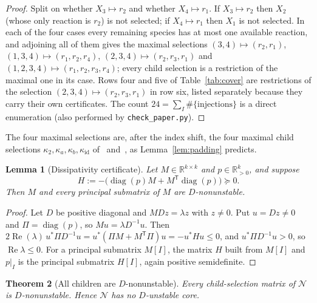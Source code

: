\documentclass[11pt,a4paper]{article}
\theoremstyle{plain}
\newtheorem{theorem}{Theorem}[section]
\newtheorem{lemma}[theorem]{Lemma}
\theoremstyle{definition}
\theoremstyle{remark}
\newcommand{\R}{\mathbb{R}}
\newcommand{\diag}{\operatorname{diag}}
\newcommand{\Real}{\operatorname{Re}}
\newcommand{\Osc}{\mathcal{N}}
\begin{document}
\begin{proof}
Split on whether $X_3\mapsto r_2$ and whether $X_4\mapsto r_1$. If $X_3\mapsto r_2$ then $X_2$ (whose only reaction is $r_2$) is not selected; if $X_4\mapsto r_1$ then $X_1$ is not selected. In each of the four cases every remaining species has at most one available reaction, and adjoining all of them gives the maximal selections $(3,4)\mapsto(r_2,r_1)$, $(1,3,4)\mapsto(r_1,r_2,r_4)$, $(2,3,4)\mapsto(r_2,r_3,r_1)$ and $(1,2,3,4)\mapsto(r_1,r_2,r_3,r_4)$; every child selection is a restriction of the maximal one in its case. Rows four and five of Table~\ref{tab:cover} are restrictions of the selection $(2,3,4)\mapsto(r_2,r_3,r_1)$ in row six, listed separately because they carry their own certificates. The count $24=\sum_{I}\#\{\text{injections}\}$ is a direct enumeration (also performed by \texttt{check\_paper.py}).
\end{proof}

The four maximal selections are, after the index shift, the four maximal child selections $\kappa_2,\kappa_a,\kappa_b,\kappa_{\mathrm{id}}$ of~\cite[Lemma~4.1]{ParameterRich2026} and~\cite[Lemma~4.2]{KineticOrder2026}, as Lemma~\ref{lem:padding} predicts.

\begin{lemma}[Dissipativity certificate]\label{lem:dissipative}
Let $M\in\R^{k\times k}$ and $p\in\R_{>0}^k$, and suppose
\begin{equation}\label{eq:energy}
H:=-\bigl(\diag(p)M+M^{\mathsf T}\diag(p)\bigr)\succeq0 .
\end{equation}
Then $M$ and every principal submatrix of $M$ are $D$-nonunstable.
\end{lemma}

\begin{proof}
Let $D$ be positive diagonal and $MDz=\lambda z$ with $z\ne0$. Put $u=Dz\ne0$ and $\Pi=\diag(p)$, so $Mu=\lambda D^{-1}u$. Then $2\Real(\lambda)\,u^*\Pi D^{-1}u=u^*(\Pi M+M^{\mathsf T}\Pi)u=-u^*Hu\le0$, and $u^*\Pi D^{-1}u>0$, so $\Real\lambda\le0$. For a principal submatrix $M[I]$, the matrix $H$ built from $M[I]$ and $p|_I$ is the principal submatrix $H[I]$, again positive semidefinite.
\end{proof}

\begin{theorem}[All children are $D$-nonunstable]\label{thm:children}
Every child-selection matrix of $\Osc$ is $D$-nonunstable. Hence $\Osc$ has no $D$-unstable core.
\end{theorem}
\end{document}
